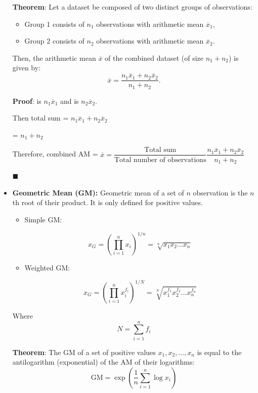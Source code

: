 \documentclass[twoside]{book}
\begin{document}
\begin{itemize}
\begin{textbox}
\textbf{Theorem}: Let a dataset be composed of two distinct groups of observations:

\begin{itemize}
  \item Group 1 consists of \( n_1 \) observations with arithmetic mean \( \overline{x}_1 \),
  \item Group 2 consists of \( n_2 \) observations with arithmetic mean \( \overline{x}_2 \).
\end{itemize}

Then, the arithmetic mean \( \overline{x} \) of the combined dataset (of size \( n_1 + n_2 \)) is given by:
\[
\overline{x} = \dfrac{n_1 \overline{x}_1 + n_2 \overline{x}_2}{n_1 + n_2}.
\]
\end{textbox}

\textbf{Proof}:  is $n_1 \overline{x}_1$ and  is $n_2 \overline{x}_2$.

Then total sum = $n_1 \overline{x}_1 + n_2 \overline{x}_2$

 = $n_1 + n_2$

Therefore, combined AM = $\overline{x} = \dfrac{\text{Total sum}}{\text{Total number of observations}} \dfrac{n_1 \overline{x}_1 + n_2 \overline{x}_2}{n_1 + n_2}$

\hfill $\blacksquare$

    \item \textbf{Geometric Mean (GM):} Geometric mean of a set of $n$ observation is the $n$th root of their product. It is only defined for positive values.

    \begin{itemize}
        \item Simple GM:
        \begin{textbox}
    \[
    x_G = \left( \prod_{i=1}^{n} x_i \right)^{1/n} = \sqrt[n]{x_1 x_2 \dots x_n}
    \]
    \end{textbox}
    \item Weighted GM:
    \begin{textbox}
    \[
    x_G = \left( \prod_{i=1}^{n} x_i^{f_i} \right)^{1/N} = \sqrt[N]{x_1^{f_1} x_2^{f_2} \dots x_n^{f_n}}
    \]
    \end{textbox}
    \end{itemize}
    Where $$N = \sum_{i=1}^n f_i$$

        \begin{textbox}
        \textbf{Theorem}: The GM of a set of positive values \( x_1, x_2, \dots, x_n \) is equal to the antilogarithm (exponential) of the AM of their logarithms:
\[
\mathrm{GM} = \exp\left( \frac{1}{n} \sum_{i=1}^n \log x_i \right)
\]
    \end{textbox}


\end{itemize}
\end{document}
